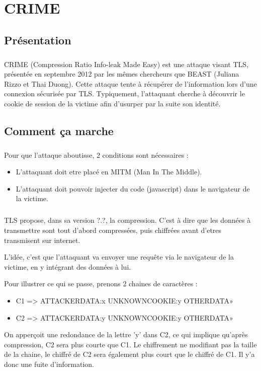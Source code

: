 \chapter{CRIME}
\label{chapter:crime}

\section{Présentation}
\paragraph{}
CRIME (Compression Ratio Info-leak Made Easy) est une attaque visant TLS, présentée en septembre 2012 par les mêmes chercheurs que BEAST (Juliana Rizzo et Thai Duong). Cette attaque tente à récupérer de l'information lors d'une connexion sécurisée par TLS. Typiquement, l'attaquant cherche à découvrir le cookie de session de la victime afin d'usurper par la suite son identité.

\section{Comment ça marche}
\paragraph{}
Pour que l'attaque aboutisse, 2 conditions sont nécessaires :
\begin{itemize}
  \item L'attaquant doit etre placé en MITM (Man In The Middle).
  \item L'attaquant doit pouvoir injecter du code (javascript) dans le navigateur de la victime.
\end{itemize}

\paragraph{}
TLS propose, dans sa version ?.?, la compression. C'est à dire que les données à transmettre sont tout d'abord compressées, puis chiffrées avant d'etres transmisent sur internet.

L'idée, c'est que l'attaquant va envoyer une requête via le navigateur de la victime, en y intégrant des données à lui.

Pour illustrer ce qui se passe, prenons 2 chaines de caractères :
\begin{itemize}
\item C1 => ATTACKERDATA:x UNKNOWNCOOKIE:y OTHERDATA»
\item C2 => ATTACKERDATA:y UNKNOWNCOOKIE:y OTHERDATA»
\end{itemize}
On apperçoit une redondance de la lettre 'y' dans C2, ce qui implique qu'après compression, C2 sera plus courte que C1. Le chiffrement ne modifiant pas la taille de la chaine, le chiffré de C2 sera également plus court que le chiffré de C1. Il y'a donc une fuite d'information.

